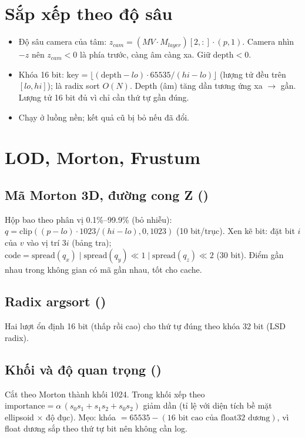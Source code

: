 \section{Sắp xếp theo độ sâu}\label{s:sort}
\begin{itemize}
\item Độ sâu camera của tâm: $z_{cam}=(MV\cdot M_{layer})[2,:]\cdot(p,1)$. Camera nhìn $-z$ nên $z_{cam}<0$ là phía trước, càng âm càng xa. Giữ $\mathrm{depth}<0$.
\item Khóa 16 bit: $\mathrm{key}=\lfloor(\mathrm{depth}-lo)\cdot65535/(hi-lo)\rfloor$ (lượng tử đều trên $[lo,hi]$);  là radix sort $O(N)$. Depth (âm) tăng dần tương ứng xa $\to$ gần. Lượng tử 16 bit đủ vì chỉ cần thứ tự gần đúng.
\item Chạy ở luồng nền; kết quả cũ bị bỏ nếu  đã đổi.
\end{itemize}

\section{LOD, Morton, Frustum}\label{s:lod}

\subsection{Mã Morton 3D, đường cong Z ()}
Hộp bao theo phân vị 0.1\%--99.9\% (bỏ nhiễu): $q=\mathrm{clip}((p-lo)\cdot1023/(hi-lo),0,1023)$ (10 bit/trục). Xen kẽ bit:  đặt bit $i$ của $v$ vào vị trí $3i$ (bảng tra); $\mathrm{code}=\mathrm{spread}(q_x)\mid\mathrm{spread}(q_y)\ll1\mid\mathrm{spread}(q_z)\ll2$ (30 bit). Điểm gần nhau trong không gian có mã gần nhau, tốt cho cache.

\subsection{Radix argsort ()}
Hai lượt ổn định 16 bit (thấp rồi cao) cho thứ tự đúng theo khóa 32 bit (LSD radix).

\subsection{Khối và độ quan trọng ()}
Cắt theo Morton thành khối 1024. Trong khối xếp theo $\mathrm{importance}=\alpha\,(s_0s_1+s_1s_2+s_0s_2)$ giảm dần (tỉ lệ với diện tích bề mặt ellipsoid $\times$ độ đục). Mẹo: khóa $=65535-(16\text{ bit cao của float32 dương})$, vì float dương sắp theo thứ tự bit nên không cần log.

